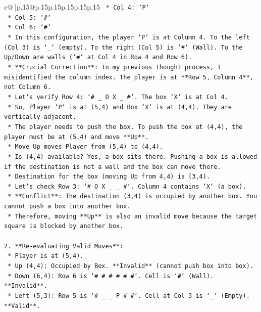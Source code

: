 \documentclass{article}
\begin{document}
{\begin{supertabular}{c@{$\;$}|p{.15\linewidth}@{}p{.15\linewidth}p{.15\linewidth}p{.15\linewidth}p{.15\linewidth}p{.15\linewidth}}
{{{\texttt{            *   Col 4: `P`} \\
\texttt{            *   Col 5: `\#`} \\
\texttt{            *   Col 6: `\#`} \\
\texttt{        *   In this configuration, the player `P` is at Column 4. To the left (Col 3) is `\_` (empty). To the right (Col 5) is `\#` (Wall). To the Up/Down are walls (`\#` at Col 4 in Row 4 and Row 6).} \\
\texttt{        *   **Crucial Correction**: In my previous thought process, I misidentified the column index. The player is at **Row 5, Column 4**, not Column 6.} \\
\texttt{        *   Let's verify Row 4: `\# \_ O X \_ \#`. The box `X` is at Col 4.} \\
\texttt{        *   So, Player `P` is at (5,4) and Box `X` is at (4,4). They are vertically adjacent.} \\
\texttt{        *   The player needs to push the box. To push the box at (4,4), the player must be at (5,4) and move **Up**.} \\
\texttt{        *   Move Up moves Player from (5,4) to (4,4).} \\
\texttt{        *   Is (4,4) available? Yes, a box sits there. Pushing a box is allowed if the destination is not a wall and the box can move there.} \\
\texttt{        *   Destination for the box (moving Up from 4,4) is (3,4).} \\
\texttt{        *   Let's check Row 3: `\# O X \_ \_ \#`. Column 4 contains `X` (a box).} \\
\texttt{        *   **Conflict**: The destination (3,4) is occupied by another box. You cannot push a box into another box.} \\
\texttt{        *   Therefore, moving **Up** is also an invalid move because the target square is blocked by another box.} \\
\\ 
\texttt{2.  **Re{-}evaluating Valid Moves**:} \\
\texttt{    *   Player is at (5,4).} \\
\texttt{    *   Up (4,4): Occupied by Box. **Invalid** (cannot push box into box).} \\
\texttt{    *   Down (6,4): Row 6 is `\# \# \# \# \# \#`. Cell is `\#` (Wall). **Invalid**.} \\
\texttt{    *   Left (5,3): Row 5 is `\# \_ \_ P \# \#`. Cell at Col 3 is `\_` (Empty). **Valid**.} \\
}}}
\end{supertabular}}
\end{document}
